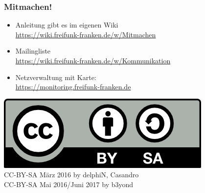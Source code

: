 \begin{frame}
\frametitle{Mitmachen!}
	\begin{itemize}
		\item Anleitung gibt es im eigenen Wiki 
			\\ \href{https://wiki.freifunk-franken.de/w/Mitmachen}{https://wiki.freifunk-franken.de/w/Mitmachen}
		\item Mailingliste 
			\\ \href{https://wiki.freifunk-franken.de/w/Kommunikation}{https://wiki.freifunk-franken.de/w/Kommunikation}
		\item Netzverwaltung mit Karte: 
			\\ \href{https://monitoring.freifunk-franken.de}{https://monitoring.freifunk-franken.de}
	\end{itemize}
	\begin{flushright}
		\includegraphics[scale=0.7]{images/CC-BY-SA.png}
		\begingroup \tiny{		
			\\CC-BY-SA März 2016 by delphiN, Casandro
			\\CC-BY-SA Mai 2016/Juni 2017 by b3yond}
		\endgroup
	\end{flushright}
\end{frame}
